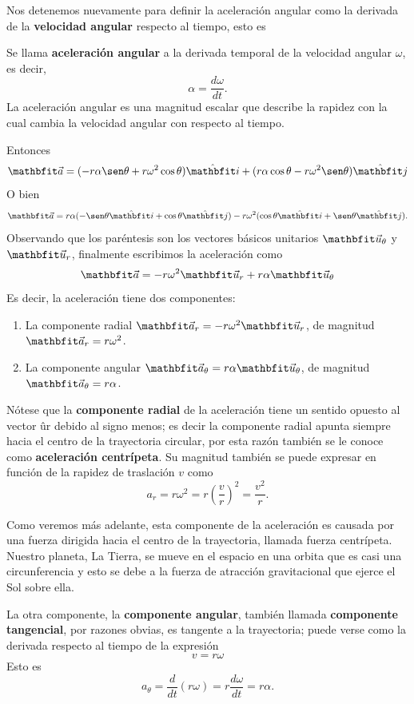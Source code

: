 Nos detenemos nuevamente para definir la aceleración angular como la derivada de la \textbf{velocidad angular} respecto al tiempo, esto es
\begin{definition}{}{}
    Se llama \textbf{aceleración angular} a la derivada temporal de la velocidad angular $\omega$, es decir,
    \begin{equation*}
        \alpha = \frac{d\omega}{dt}.
    \end{equation*}
    La aceleración angular es una magnitud escalar que describe la rapidez con la cual cambia la velocidad angular con respecto al tiempo.
\end{definition}
Entonces
$$\acei = (-r\alpha\sen\theta + r\omega^2\cos\theta)\veci + (r\alpha\cos\theta - r\omega^2\sen\theta)\vecj$$
O bien
$$\acei = r\alpha (-\sen\theta\veci + \cos\theta\vecj) - r\omega^2(\cos\theta\veci + \sen\theta\vecj).$$
Observando que los paréntesis son los vectores básicos unitarios $\velou_\theta$ y $\velou_r$, finalmente escribimos la aceleración como
$$\acei = -r\omega^2\velou_r + r\alpha\velou_\theta$$
Es decir, la aceleración tiene dos componentes:
\begin{enumerate}[label=\emph{\roman*)}]
    \item La componente radial $\acei_r = -r\omega^2\velou_r$, de magnitud $\acei_r = r\omega^2$.
    \item La componente angular $\acei_\theta = r\alpha\velou_\theta$, de magnitud $\acei_\theta = r\alpha$.
\end{enumerate}
Nótese que la \textbf{componente radial} de la aceleración tiene un sentido opuesto al vector ûr debido al signo menos; es decir la componente radial apunta siempre hacia el centro de la trayectoria circular, por esta razón también se le conoce como \textbf{aceleración centrípeta}. Su magnitud también se puede expresar en función de la rapidez de traslación $v$ como
$$a_r = r\omega^2 = r\left(\frac{v}{r}\right)^2 = \frac{v^2}{r}.$$

Como veremos más adelante, esta componente de la aceleración es causada por una fuerza dirigida hacia el centro de la trayectoria, llamada fuerza centrípeta. Nuestro planeta, La Tierra, se mueve en el espacio en una orbita que es casi una circunferencia y esto se debe a la fuerza de atracción gravitacional que ejerce el Sol sobre ella.

La otra componente, la \textbf{componente angular}, también llamada \textbf{componente tangencial}, por razones obvias, es tangente a la trayectoria; puede verse como la derivada respecto al tiempo de la expresión
$$v = r\omega$$
Esto es
$$a_\theta = \frac{d}{dt}(r\omega) = r\frac{d\omega}{dt} = r\alpha.$$

